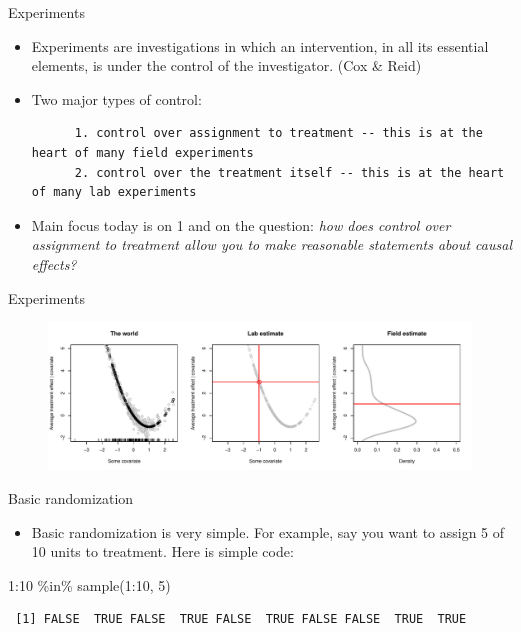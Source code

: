 \documentclass[
  11pt,
  ignorenonframetext,
]{beamer}
\newenvironment{Shaded}{\begin{snugshade}}{\end{snugshade}}
\newcommand{\DecValTok}[1]{\textcolor[rgb]{0.68,0.00,0.00}{#1}}
\newcommand{\FunctionTok}[1]{\textcolor[rgb]{0.28,0.35,0.67}{#1}}
\newcommand{\NormalTok}[1]{\textcolor[rgb]{0.00,0.23,0.31}{#1}}
\newcommand{\SpecialCharTok}[1]{\textcolor[rgb]{0.37,0.37,0.37}{#1}}
\providecommand{\tightlist}{%
  \setlength{\itemsep}{0pt}\setlength{\parskip}{0pt}}\usepackage{longtable,booktabs,array}
\begin{document}
\begin{frame}[fragile]{Experiments}
\protect\hypertarget{experiments}{}
\begin{itemize}
\item
  Experiments are investigations in which an intervention, in all its
  essential elements, is under the control of the investigator. (Cox \&
  Reid)
\item
  Two major types of control:

\begin{verbatim}
      1. control over assignment to treatment -- this is at the heart of many field experiments 
      2. control over the treatment itself -- this is at the heart of many lab experiments
\end{verbatim}
\item
  Main focus today is on 1 and on the question:
  \textit{how does control over assignment to treatment allow you to make reasonable statements about causal effects?}
\end{itemize}
\end{frame}

\begin{frame}{Experiments}
\protect\hypertarget{experiments-1}{}
\begin{figure}[h]
\centering
\includegraphics[width=\linewidth]{figs/labfield}
\end{figure}
\end{frame}

\begin{frame}[fragile]{Basic randomization \label{schemes}}
\protect\hypertarget{basic-randomization}{}
\hyperlink{ideas}{}

\begin{itemize}
\tightlist
\item
  Basic randomization is very simple. For example, say you want to
  assign 5 of 10 units to treatment. Here is simple code:
\end{itemize}

\begin{Shaded}
\begin{Highlighting}[]
\DecValTok{1}\SpecialCharTok{:}\DecValTok{10} \SpecialCharTok{\%in\%} \FunctionTok{sample}\NormalTok{(}\DecValTok{1}\SpecialCharTok{:}\DecValTok{10}\NormalTok{, }\DecValTok{5}\NormalTok{)    }
\end{Highlighting}
\end{Shaded}

\begin{verbatim}
 [1] FALSE  TRUE FALSE  TRUE FALSE  TRUE FALSE FALSE  TRUE  TRUE
\end{verbatim}
\end{frame}
\end{document}
